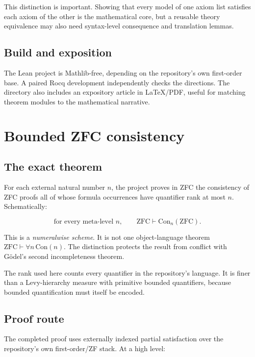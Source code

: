 \documentclass[
  10pt,
  a4paper,
  twoside,
  open=any,
  parskip=half,
  headings=big
]{scrreprt}
\begin{document}
This distinction is important.  Showing that every model of one axiom list
satisfies each axiom of the other is the mathematical core, but a reusable
theory equivalence may also need syntax-level consequence and translation
lemmas.

\subsection{Build and exposition}

The Lean project is Mathlib-free, depending on the repository's own
first-order base.  A paired Rocq development independently checks the
directions.  The directory also includes an expository article in
\LaTeX/PDF, useful for matching theorem modules to the mathematical narrative.

\section{Bounded ZFC consistency}
\label{sec:bounded-zfc}

\subsection{The exact theorem}

For each external natural number \(n\), the project proves in ZFC the
consistency of ZFC proofs all of whose formula occurrences have quantifier rank
at most \(n\).  Schematically:

\[
  \text{for every meta-level } n,\qquad
  \mathrm{ZFC}\vdash \mathrm{Con}_n(\mathrm{ZFC}).
\]

This is a \emph{numeralwise scheme}.  It is not one object-language theorem
\(\mathrm{ZFC}\vdash\forall n\,\mathrm{Con}(n)\).  The distinction protects the
result from conflict with Gödel's second incompleteness theorem.

The rank used here counts every quantifier in the repository's language.  It
is finer than a Levy-hierarchy measure with primitive bounded quantifiers,
because bounded quantification must itself be encoded.

\subsection{Proof route}

The completed proof uses externally indexed partial satisfaction over the
repository's own first-order/ZF stack.  At a high level:
\end{document}

